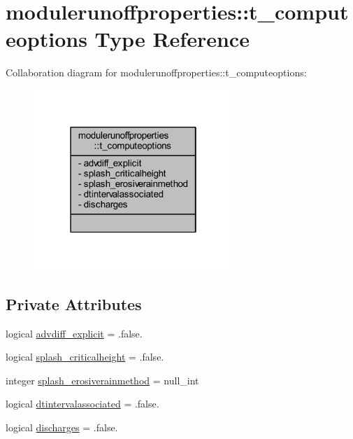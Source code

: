 \hypertarget{structmodulerunoffproperties_1_1t__computeoptions}{}\section{modulerunoffproperties\+:\+:t\+\_\+computeoptions Type Reference}
\label{structmodulerunoffproperties_1_1t__computeoptions}


Collaboration diagram for modulerunoffproperties\+:\+:t\+\_\+computeoptions\+:\nopagebreak
\begin{figure}[H]
\begin{center}
\leavevmode
\includegraphics[width=214pt]{structmodulerunoffproperties_1_1t__computeoptions__coll__graph}
\end{center}
\end{figure}
\subsection*{Private Attributes}
\begin{DoxyCompactItemize}
\item 
logical \mbox{\hyperlink{structmodulerunoffproperties_1_1t__computeoptions_a7853e12ec144fa1e43f2d822046230ce}{advdiff\+\_\+explicit}} = .false.
\item 
logical \mbox{\hyperlink{structmodulerunoffproperties_1_1t__computeoptions_ae8970d2940bbda51ea41d9ee1d291c63}{splash\+\_\+criticalheight}} = .false.
\item 
integer \mbox{\hyperlink{structmodulerunoffproperties_1_1t__computeoptions_a4fe8f7f42ad39e576e179fbf1c6da3e1}{splash\+\_\+erosiverainmethod}} = null\+\_\+int
\item 
logical \mbox{\hyperlink{structmodulerunoffproperties_1_1t__computeoptions_a82c71f793fc93d83de3a98270f1f5986}{dtintervalassociated}} = .false.
\item 
logical \mbox{\hyperlink{structmodulerunoffproperties_1_1t__computeoptions_a74afaac1f1c12ac09e6bf2c669b29da9}{discharges}} = .false.
\end{DoxyCompactItemize}


